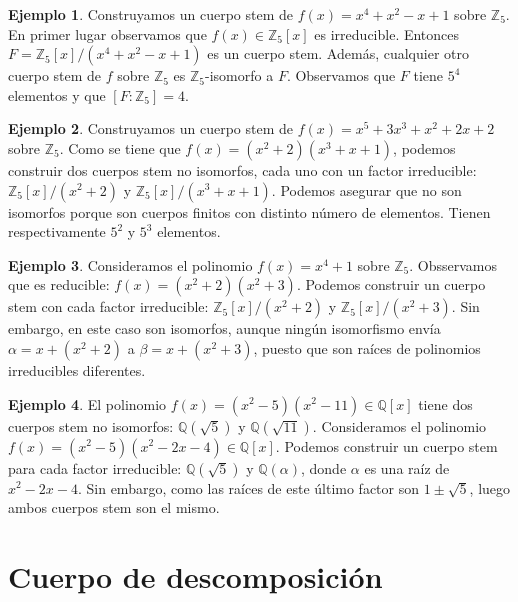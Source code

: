 \documentclass{report}
\theoremstyle{remark}
\theoremstyle{definition}
\theoremstyle{definition}
\theoremstyle{definition}
\newtheorem*{example}{Ejemplo}
\begin{document}
\begin{example}
    Construyamos un cuerpo stem de $f(x) = x^4 + x^2 - x + 1$ sobre $\mathbb{Z}_5$.
    En primer lugar observamos que $f(x) \in \mathbb{Z}_5[x]$ es irreducible.
    Entonces $F = \mathbb{Z}_5[x]/(x^4 + x^2 - x + 1)$ es un cuerpo stem.
    Además, cualquier otro cuerpo stem de $f$ sobre $\mathbb{Z}_5$ es $\mathbb{Z}_5$-isomorfo a $F$.
    Observamos que $F$ tiene $5^4$ elementos y que $[F : \mathbb{Z}_5] = 4$.
\end{example}

\begin{example}
    Construyamos un cuerpo stem de $f(x) = x^5 + 3x^3 + x^2 + 2x +2$ sobre $\mathbb{Z}_5$.
    Como se tiene que $f(x) = (x^2 + 2)(x^3 + x + 1)$, podemos construir dos cuerpos stem no isomorfos, cada uno con un factor irreducible: $\mathbb{Z}_5[x]/(x^2+2)$ y $\mathbb{Z}_5[x]/(x^3+x+1)$.
    Podemos asegurar que no son isomorfos porque son cuerpos finitos con distinto número de elementos.
    Tienen respectivamente $5^2$ y $5^3$ elementos.
\end{example}

\begin{example}
    Consideramos el polinomio $f(x) = x^4 + 1$ sobre $\mathbb{Z}_5$.
    Obsservamos que es reducible: $f(x) = (x^2+2)(x^2+3)$.
    Podemos construir un cuerpo stem con cada factor irreducible: $\mathbb{Z}_5[x]/(x^2+2)$ y $\mathbb{Z}_5[x]/(x^2+3)$.
    Sin embargo, en este caso son isomorfos, aunque ningún isomorfismo envía $\alpha = x + (x^2+2)$ a $\beta = x + (x^2+3)$, puesto que son raíces de polinomios irreducibles diferentes.
\end{example}

\begin{example}
    El polinomio $f(x) = (x^2-5)(x^2-11) \in \mathbb{Q}[x]$ tiene dos cuerpos stem no isomorfos: $\mathbb{Q}(\sqrt{5})$ y $\mathbb{Q}(\sqrt{11})$.
    Consideramos el polinomio $f(x) = (x^2-5)(x^2-2x-4) \in \mathbb{Q}[x]$. Podemos construir un cuerpo stem para cada factor irreducible: $\mathbb{Q}(\sqrt{5})$ y $\mathbb{Q}(\alpha)$, donde $\alpha$ es una raíz de $x^2-2x-4$.
    Sin embargo, como las raíces de este último factor son $1 \pm \sqrt{5}$, luego ambos cuerpos stem son el mismo.
\end{example}

\section{Cuerpo de descomposición}
\end{document}
